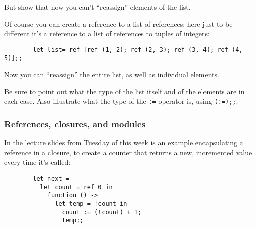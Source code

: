 \documentclass[12pt]{article}
\begin{document}
        \vspace{-1mm}

      But show that now you can't ``reassign'' elements of the list.

        Of course you can create a reference to a list of references; here
      just to be different it's a reference to a list of references to
      tuples of integers:

        \vspace{-2mm}

        \begin{center}

          \begin{BVerbatim}
        let list= ref [ref (1, 2); ref (2, 3); ref (3, 4); ref (4, 5)];;
          \end{BVerbatim}

        \end{center}

        \vspace{-1mm}

        Now you can ``reassign'' the entire list, as well as individual
      elements.

        Be sure to point out what the type of the list itself and of the
      elements are in each case.  Also illustrate what the type of the
      \texttt{:=} operator is, using \texttt{(:=);;}.

      \subsubsection{References, closures, and modules}

        In the lecture slides from Tuesday of this week is an example
      encapsulating a reference in a closure, to create a counter that
      returns a new, incremented value every time it's called:

        \vspace{-1mm}

        \begin{center}

          \begin{BVerbatim}
        let next =
          let count = ref 0 in
            function () ->
              let temp = !count in
                count := (!count) + 1;
                temp;;
          \end{BVerbatim}

        \end{center}
\end{document}
